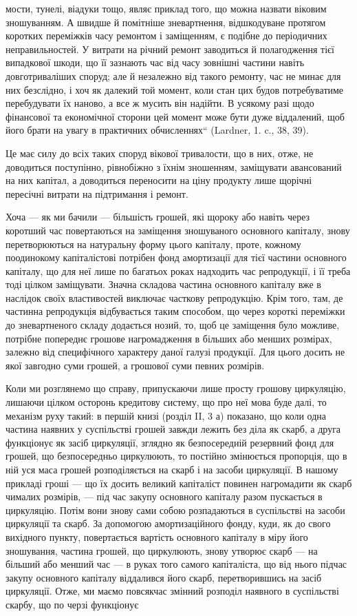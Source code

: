 мости, тунелі, віадуки тощо, являє приклад того, що можна назвати
віковим зношуванням. А швидше й помітніше зневартнення, відшкодуване
протягом коротких переміжків часу ремонтом і заміщенням, є подібне
до періодичних неправильностей. У витрати на річний ремонт заводиться
й полагодження тієї випадкової шкоди, що її зазнають час від часу
зовнішні частини навіть довготриваліших споруд; але й незалежно від
такого ремонту, час не минає для них безслідно, і хоч як далекий той момент,
коли стан цих будов потребуватиме перебудувати їх наново, а все ж
мусить він надійти. В усякому разі щодо фінансової та економічної сторони
цей момент може бути дуже віддалений, щоб його брати на увагу
в практичних обчисленнях“ (Lardner, 1. c., 38, 39).

Це має силу до всіх таких споруд вікової тривалости, що в них,
отже, не доводиться поступінно, рівнобіжно з їхнім зношенням, заміщувати
авансований на них капітал, а доводиться переносити на ціну продукту
лише щорічні пересічні витрати на підтримання і ремонт.

Хоча — як ми бачили — більшість грошей, які щороку або навіть
через коротший час повертаються на заміщення зношуваного основного
капіталу, знову перетворюються на натуральну форму цього капіталу,
проте, кожному поодинокому капіталістові потрібен фонд амортизації для тієї
частини основного капіталу, що для неї лише по багатьох роках надходить час
репродукції, і її треба тоді цілком заміщувати. Значна складова частина основного
капіталу вже в наслідок своїх властивостей виключає часткову репродукцію.
Крім того, там, де частинна репродукція відбувається таким способом, що
через короткі переміжки до зневартненого складу додається нозий, то, щоб це
заміщення було можливе, потрібне попереднє грошове нагромадження
в більших або менших розмірах, залежно від специфічного характеру
даної галузі продукції. Для цього досить не якої завгодно суми грошей,
а грошової суми певних розмірів.

Коли ми розглянемо що справу, припускаючи лише просту грошову
циркуляцію, лишаючи цілком осторонь кредитову систему, що про неї
мова буде далі, то механізм руху такий: в першій книзі (розділ II, 3 а)
показано, що коли одна частина наявних у суспільстві грошей завжди
лежить без діла як скарб, а друга функціонує як засіб циркуляції, зглядно
як безпосередній резервний фонд для грошей, що безпосередньо циркулюють,
то постійно змінюється пропорція, що в ній уся маса грошей
розподіляється на скарб і на засоби циркуляції. В нашому прикладі
гроші — що їх досить великий капіталіст повинен нагромадити як скарб
чималих розмірів, — під час закупу основного капіталу разом пускається
в циркуляцію. Потім вони знову сами собою розпадаються в суспільстві
на засоби циркуляції та скарб. За допомогою амортизаційного фонду,
куди, як до свого вихідного пункту, повертається вартість основного капіталу
в міру його зношування, частина грошей, що циркулюють, знову
утворює скарб — на більший або менший час — в руках того самого капіталіста,
що від нього підчас закупу основного капіталу віддалився його
скарб, перетворившись на засіб циркуляції. Отже, ми маємо повсякчас
змінний розподіл наявного в суспільстві скарбу, що по черзі функціонує
